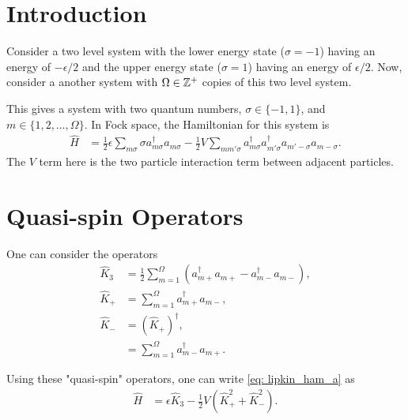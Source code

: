 \documentclass[
a4paper,
10pt,
twoside,
]{article}
\begin{document}
{}
\maketitle
\startmcols


\section{Introduction}\label{sec: intro}


Consider a two level system with the lower energy state ($\sigma = -1$) having an energy of $-\epsilon/2$ and the upper energy state ($\sigma=1$) having an energy of $\epsilon/2$.
Now, consider a another system with $\Omega \in \mathbb{Z}^+$ copies of this two level system.

This gives a system with two quantum numbers, $\sigma \in \{-1,1\}$, and $m \in \{1,2,\dots,\Omega\}$.
In Fock space, the Hamiltonian for this system is
\begin{align}
	\hat{H} &= \frac{1}{2} \epsilon \sum_{m\sigma}\sigma a_{m\sigma}^\dagger a_{m\sigma}- \frac{1}{2}V\sum_{mm'\sigma}a_{m\sigma}^\dagger a_{m'\sigma}^\dagger a_{m'-\sigma}a_{m-\sigma}.
	\label{eq: lipkin_ham_a}
\end{align}
The $V$ term here is the two particle interaction term between adjacent particles.

\section{Quasi-spin Operators} \label{sec: qs operators}

One can consider the operators
\begin{align}
	\hat{K}_3 &= \frac{1}{2} \sum_{m=1}^\Omega (a_{m+}^\dagger a_{m+}-a_{m-}^\dagger a_{m-}),\\
	\hat{K}_+ &= \sum_{m=1}^\Omega a_{m+}^\dagger a_{m-},\\
	\hat{K}_- &= (\hat{K}_+)^\dagger,\\
		&= \sum_{m=1}^\Omega a_{m-}^\dagger a_{m+}.
\end{align}

Using these "quasi-spin" operators, one can write \ref{eq: lipkin_ham_a} as
\begin{align}
	\hat{H} &= \epsilon \hat{K}_3 - \frac{1}{2}V (\hat{K}_+^2+\hat{K}_-^2).
	\label{eq: lipkin_ham_k}
\end{align}
\end{document}

